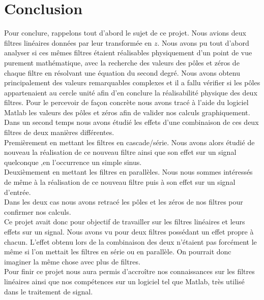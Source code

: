 \documentclass[12,french]{report}
\begin{document}
\chapter*{Conclusion}

Pour conclure, rappelons tout d'abord le sujet de ce projet. Nous avions deux filtres linéaires données par leur transformée en $z$. Nous avons pu tout d'abord analyser si ces mêmes filtres étaient réalisables physiquement d'un point de vue purement mathématique, avec la recherche des valeurs des pôles et zéros de chaque filtre en résolvant une équation du second degré. Nous avons obtenu principalement des valeurs remarquables complexes et il a fallu vérifier si les pôles appartenaient au cercle unité afin d'en conclure la réalisabilité physique des deux filtres. Pour le percevoir de façon concrète nous avons tracé à l'aide du logiciel Matlab les valeurs des pôles et zéros afin de valider nos calculs graphiquement.\\


Dans un second temps nous avons étudié les effets d'une combinaison de ces deux filtres de deux manières différentes.\\
Premièrement en mettant les filtres en cascade/série. Nous avons alors étudié de nouveau la réalisation de ce nouveau filtre ainsi que son effet sur un signal quelconque ,en l'occurrence un simple sinus.\\
Deuxièmement en mettant les filtres en parallèles. Nous nous sommes intéressés de même à la réalisation de ce nouveau filtre puis à son effet sur un signal d'entrée.\\
Dans les deux cas nous avons retracé les pôles et les zéros de nos filtres pour confirmer nos calculs.\\


Ce projet avait donc pour objectif de travailler sur les filtres linéaires et leurs effets sur un signal. Nous avons vu pour deux filtres possédant un effet propre à chacun. L'effet obtenu lors de la combinaison des deux n'étaient pas forcément le même si l'on mettait les filtres en série ou en parallèle. On pourrait donc imaginer la même chose avec plus de filtres.\\

Pour finir ce projet nous aura permis d'accroître nos connaissances sur les filtres linéaires ainsi que nos compétences sur un logiciel tel que Matlab, très utilisé dans le traitement de signal. 
\end{document}
